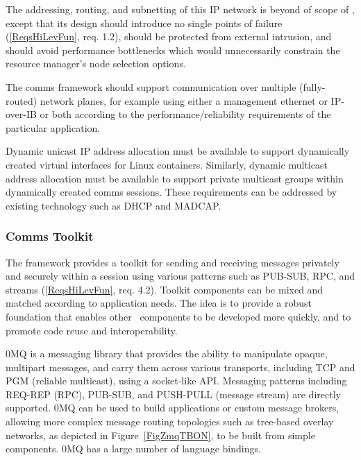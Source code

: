 The addressing, routing, and subnetting of this IP network is beyond of
scope of \ngrm, except that its design should introduce no single
points of failure (\ref{ReqsHiLevFun}, req. 1.2), should be protected
from external intrusion, and should avoid performance bottlenecks which
would unnecessarily constrain the resource manager's node selection options.

The comms framework should support communication over multiple
(fully-routed) network planes, for example using either a management
ethernet or IP-over-IB or both according to the performance/reliability
requirements of the particular application.

Dynamic unicast IP address allocation must be available to support
dynamically created virtual interfaces for Linux containers.  Similarly,
dynamic multicast address allocation must be available to support
private multicast groups within dynamically created comms sessions.
These requirements can be addressed by existing technology such as
DHCP\cite{rfc2131} and MADCAP\cite{rfc2730}.

\subsubsection{Comms Toolkit}

The framework provides a toolkit for sending and receiving
messages privately and securely within a session using
various patterns such as PUB-SUB, RPC, and streams
(\ref{ReqsHiLevFun}, req. 4.2).  Toolkit components can be mixed and
matched according to application needs.
The idea is to provide a robust foundation that enables other
\ngrm\ components to be developed more quickly, and to promote
code reuse and interoperability.

0MQ\cite{ZMQGuide} is a messaging library that
provides the ability to manipulate opaque, multipart messages, and
carry them across various transports, including TCP and PGM\cite{rfc3208}
(reliable multicast), using a socket-like API.  Messaging patterns
including REQ-REP (RPC), PUB-SUB, and PUSH-PULL (message stream)
are directly supported.
0MQ can be used to build applications or custom message brokers,
allowing more complex message routing topologies such as tree-based
overlay networks, as depicted in Figure~\ref{FigZmqTBON}, to be built
from simple components.  0MQ has a large number of language bindings.

